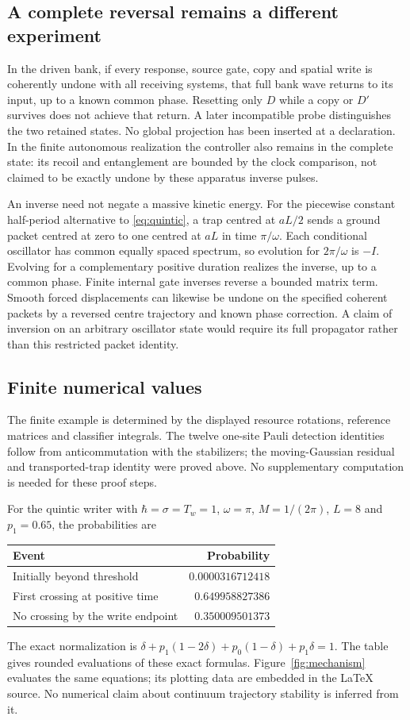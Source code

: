 \documentclass[11pt]{article}
\theoremstyle{definition}\newtheorem{assumption}[theorem]{Constitutive assumption}
\theoremstyle{remark}\newtheorem{remark}[theorem]{Remark}
\begin{document}
\subsection{A complete reversal remains a different experiment}
In the driven bank, if every response, source gate, copy and spatial write is coherently undone with all receiving systems, that full bank wave returns to its input, up to a known common phase. Resetting only $D$ while a copy or $D'$ survives does not achieve that return. A later incompatible probe distinguishes the two retained states. No global projection has been inserted at a declaration. In the finite autonomous realization the controller also remains in the complete state: its recoil and entanglement are bounded by the clock comparison, not claimed to be exactly undone by these apparatus inverse pulses.

An inverse need not negate a massive kinetic energy. For the piecewise constant half-period alternative to \eqref{eq:quintic}, a trap centred at $aL/2$ sends a ground packet centred at zero to one centred at $aL$ in time $\pi/\omega$. Each conditional oscillator has common equally spaced spectrum, so evolution for $2\pi/\omega$ is $-I$. Evolving for a complementary positive duration realizes the inverse, up to a common phase. Finite internal gate inverses reverse a bounded matrix term. Smooth forced displacements can likewise be undone on the specified coherent packets by a reversed centre trajectory and known phase correction. A claim of inversion on an arbitrary oscillator state would require its full propagator rather than this restricted packet identity.

\subsection{Finite numerical values}
The finite example is determined by the displayed resource rotations, reference matrices and classifier integrals. The twelve one-site Pauli detection identities follow from anticommutation with the stabilizers; the moving-Gaussian residual and transported-trap identity were proved above. No supplementary computation is needed for these proof steps.

For the quintic writer with $\hbar=\sigma=T_w=1$, $\omega=\pi$, $M=1/(2\pi)$, $L=8$ and $p_1=0.65$, the probabilities are
\begin{center}
\begin{tabular}{@{}lr@{}}\toprule
Event & Probability\\\midrule
Initially beyond threshold & $0.0000316712418$\\
First crossing at positive time & $0.649958827386$\\
No crossing by the write endpoint & $0.350009501373$\\\bottomrule
\end{tabular}
\end{center}
The exact normalization is $\delta+p_1(1-2\delta)+p_0(1-\delta)+p_1\delta=1$. The table gives rounded evaluations of these exact formulas. Figure~\ref{fig:mechanism} evaluates the same equations; its plotting data are embedded in the LaTeX source. No numerical claim about continuum trajectory stability is inferred from it.
\end{document}
